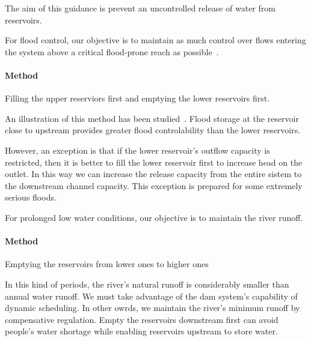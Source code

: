 \documentclass{mcmthesis}
\begin{document}
The aim of this guidance is prevent an uncontrolled release of water from reservoirs.

For flood control, our objective is to maintain as much control over flows entering the system above a critical flood-prone reach as possible~\cite{Jay_Rules}.
\paragraph{Method} Filling the upper reserviors first and emptying the lower reservoirs first.

An illustration of this method has been studied~\cite{Kelman}. Flood storage at the reservoir close to upstream provides greater flood controlability than the lower reservoirs.

However, an exception is that if the lower reservoir's outflow capacity is restricted, then it is better to fill the lower reservoir first to increase head on the outlet. In this way we can increase the release capacity from the entire sistem to the downstream channel capacity. This exception is prepared for some extremely serious floods.

For prolonged low water conditions, our objective is to maintain the river runoff.

\paragraph{Method} Emptying the reservoirs from lower ones to higher ones

In this kind of periods, the river's natural runoff is considerably smaller than annual water runoff. We must take advantage of the dam system's capability of dynamic scheduling. In other owrds, we maintain the river's minimum runoff by compensative regulation. Empty the reservoirs downstream first can avoid people's water shortage while enabling reservoirs upstream to store water.
\end{document}
